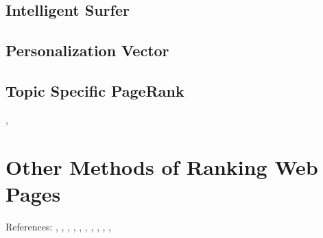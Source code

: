 \documentclass[11pt]{report}
\begin{document}
\section{Intelligent Surfer}
\cite{richardson2002intelligent}
\section{Personalization Vector}
\section{Topic Specific PageRank}
\cite{haveliwala1999efficient}, \cite{haveliwala2002topic}


\chapter{Other Methods of Ranking Web Pages}
References: \cite{baldi2003modeling}, \cite{bharat1998improved}, \cite{bonato}, \cite{ding2003pagerank}, \cite{farahat2006authority}, \cite{kleinberg1999authoritative}, \cite{langville}, \cite{lempel2000stochastic}, \cite{manning}, \cite{ng2001link}, \cite{ng2001stable}
\end{document}
